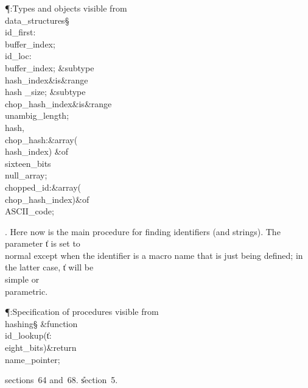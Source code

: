 \Y\P\?\4:Types and objects visible from \\{data\_structures}\X\mathrel{+}\S%
\?\6
\\{id\_first}\?:\?\\{buffer\_index};\6
\\{id\_loc}\?:\?\\{buffer\_index};\7
\&{subtype}\8\\{hash\_index}\8\&{is}\8\8\&{range}\?\to\?\\{hash%
\_size};\6
\&{subtype}\8\\{chop\_hash\_index}\8\&{is}\8\8\&{range}\?\to\?%
\\{unambig\_length};\6
\\{hash}\?,\?\\{chop\_hash}\?:\1\&{array}\8\1(\?\\{hash\_index}\?\2)\2\8%
\&{of}\?\8\\{sixteen\_bits}\?\K\?\\{null\_array};\6
\\{chopped\_id}\?:\1\&{array}\8\1(\?\\{chop\_hash\_index}\?\2)\2\8\&{of}\?\8%
\\{ASCII\_code};\par
\fi

. Here now is the main procedure for finding identifiers (and strings).
The parameter \|t is set to \\{normal} except when the identifier is
a macro name that is just being defined; in the latter case, \|t will be
\\{simple} or \\{parametric}.

\Y\P\?\4:Specification of procedures visible from \\{hashing}\X\S\?\6
\&{function}\8\1\\{id\_lookup}\?(\1\?\|t\?:\?\\{eight\_bits}\?\2)\&{return}\?\8%
\\{name\_pointer}\2;\par
\A sections~64 and~68.
\U section~5\*.\fi

